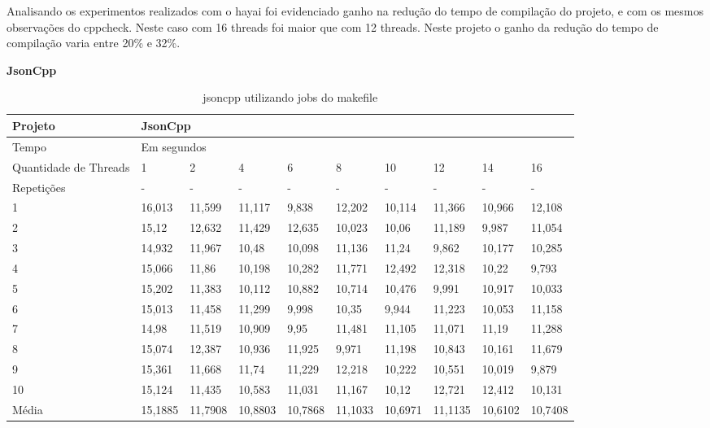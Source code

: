 Analisando os experimentos realizados com o hayai foi evidenciado ganho
 na redução do tempo de compilação do projeto, e com os mesmos
 observações do cppcheck. Neste caso com 16 threads foi maior que com
 12 threads. Neste projeto o ganho da redução do tempo de
 compilação varia entre 20\% e 32\%.

\textbf{JsonCpp}


\begin{table}[h]
\centering
\begin{tabular}{|p{1cm}|p{1.4cm}|p{1.4cm}|p{1.4cm}|p{1.4cm}|p{1.4cm}|p{1.4cm}|p{1.4cm}|p{1.4cm}|p{1.4cm}|}
\hline
Projeto               & \multicolumn{9}{l|}{JsonCpp}        \\ \hline
Tempo                 & \multicolumn{9}{l|}{Em segundos}      \\ \hline
Quantidade de Threads & 1 & 2 & 4 & 6 & 8 & 10 & 12 & 14 & 16 \\ \hline
Repetições            & - & - & - & - & - & -  & -  & -  & -  \\ \hline
1 & 16,013   & 11,599  & 11,117  & 9,838   & 12,202  & 10,114  & 11,366  & 10,966  & 12,108 \\ \hline
2 & 15,12    & 12,632  & 11,429  & 12,635  & 10,023  & 10,06   & 11,189  & 9,987   & 11,054 \\ \hline
3 & 14,932   & 11,967  & 10,48   & 10,098  & 11,136  & 11,24   & 9,862   & 10,177  & 10,285 \\ \hline
4 & 15,066   & 11,86   & 10,198  & 10,282  & 11,771  & 12,492  & 12,318  & 10,22   & 9,793 \\ \hline
5 & 15,202   & 11,383  & 10,112  & 10,882  & 10,714  & 10,476  & 9,991   & 10,917  & 10,033 \\ \hline
6 & 15,013   & 11,458  & 11,299  & 9,998   & 10,35   & 9,944   & 11,223  & 10,053  & 11,158 \\ \hline
7 & 14,98    & 11,519  & 10,909  & 9,95    & 11,481  & 11,105  & 11,071  & 11,19   & 11,288 \\ \hline
8 & 15,074   & 12,387  & 10,936  & 11,925  & 9,971   & 11,198  & 10,843  & 10,161  & 11,679 \\ \hline
9 & 15,361   & 11,668  & 11,74   & 11,229  & 12,218  & 10,222  & 10,551  & 10,019  & 9,879 \\ \hline
10 & 15,124   & 11,435  & 10,583  & 11,031  & 11,167  & 10,12   & 12,721  & 12,412  & 10,131 \\ \hline
Média & 15,1885  & 11,7908 & 10,8803 & 10,7868 & 11,1033 & 10,6971 & 11,1135 & 10,6102 & 10,7408 \\ \hline
\end{tabular}
\caption{jsoncpp utilizando jobs do makefile}
\label{tab:jsoncpp}
\end{table}


